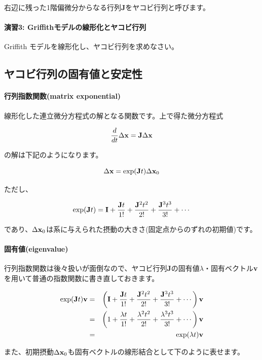 右辺に残った1階偏微分からなる行列{\bf J}をヤコビ行列と呼びます。


\paragraph{演習3:  Griffithモデルの線形化とヤコビ行列}
Griffith モデルを線形化し、ヤコビ行列を求めなさい。

\subsection{ヤコビ行列の固有値と安定性}
\paragraph{行列指数関数(matrix exponential)}
線形化した連立微分方程式の解となる関数です。上で得た微分方程式

\[ \frac{d}{dt}\Delta {\bf x} = {\bf J}\Delta {\bf x}\]

の解は下記のようになります。

\[\Delta {\bf x}=\exp({\bf J}t)\Delta {\bf x}_0\]

ただし、

\[\exp({\bf J}t) = {\bf I} + \frac{{\bf J}t}{1!} + \frac{{\bf J}^2 t^2}{2!} + \frac{{\bf J}^3 t^3}{3!} + \cdots\]

であり、\(\Delta {\bf x}_0\)は系に与えられた摂動の大きさ(固定点からのずれの初期値)です。

\paragraph{固有値(eigenvalue)}
行列指数関数は後々扱いが面倒なので、ヤコビ行列{\bf J}の固有値\(\lambda\)・固有ベクトル{\bf v}を用いて普通の指数関数に書き直しておきます。

\begin{eqnarray*}
\exp({\bf J}t){\bf v} & = & \left({\bf I} + \frac{{\bf J}t}{1!} + \frac{{\bf J}^2 t^2}{2!} + \frac{{\bf J}^3 t^3}{3!} + \cdots \right){\bf v}\\
                      & = & \left(1 + \frac{\lambda t}{1!} + \frac{\lambda^2 t^2}{2!} + \frac{\lambda^3 t^3}{3!} + \cdots \right){\bf v}\\
                      & = & \exp(\lambda t) {\bf v}\\
\end{eqnarray*}

また、初期摂動\(\Delta {\bf x}_0\)も固有ベクトルの線形結合として下のように表せます。

